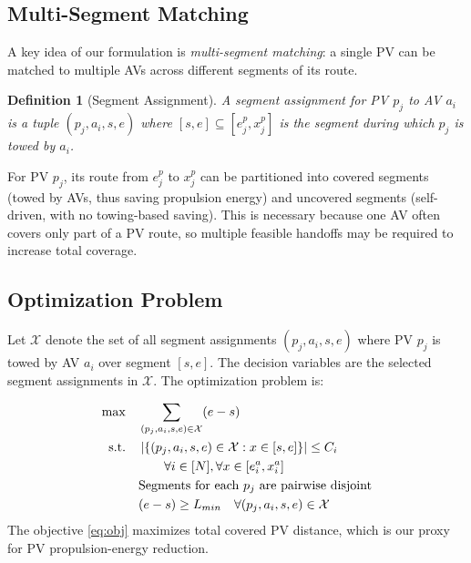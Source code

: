 \documentclass[conference]{IEEEtran}
\newtheorem{definition}{Definition}
\begin{document}
\subsection{Multi-Segment Matching}

A key idea of our formulation is \textit{multi-segment matching}: a single PV can be matched to multiple AVs across different segments of its route.

\begin{definition}[Segment Assignment]
A segment assignment for PV $p_j$ to AV $a_i$ is a tuple $(p_j, a_i, s, e)$ where $[s, e] \subseteq [e_j^p, x_j^p]$ is the segment during which $p_j$ is towed by $a_i$.
\end{definition}

For PV $p_j$, its route from $e_j^p$ to $x_j^p$ can be partitioned into covered segments (towed by AVs, thus saving propulsion energy) and uncovered segments (self-driven, with no towing-based saving).
This is necessary because one AV often covers only part of a PV route, so multiple feasible handoffs may be required to increase total coverage.

\subsection{Optimization Problem}

Let $\mathcal{X}$ denote the set of all segment assignments $(p_j, a_i, s, e)$ where PV $p_j$ is towed by AV $a_i$ over segment $[s, e]$. The decision variables are the selected segment assignments in $\mathcal{X}$. The optimization problem is:

\begin{align}
    \max \quad & \sum_{(p_j, a_i, s, e) \in \mathcal{X}} (e - s) \label{eq:obj}\\
    \text{s.t.} \quad & \left|\{(p_j, a_i, s, e) \in \mathcal{X} : x \in [s, e]\}\right| \leq C_i \notag\\
    & \qquad \forall i \in [N], \forall x \in [e_i^a, x_i^a] \label{eq:capacity}\\
    & \text{Segments for each } p_j \text{ are pairwise disjoint} \label{eq:nonoverlap}\\
    & (e - s) \geq L_{min} \quad \forall (p_j, a_i, s, e) \in \mathcal{X} \label{eq:minlen}
\end{align}
The objective \eqref{eq:obj} maximizes total covered PV distance, which is our proxy for PV propulsion-energy reduction.
\end{document}
